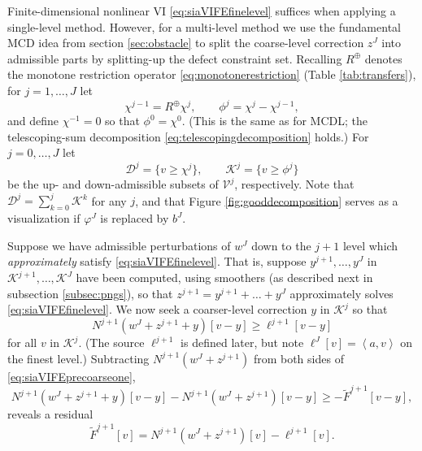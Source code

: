 \documentclass[letterpaper,final,12pt,reqno]{amsart}
\theoremstyle{claim}
\newcommand{\ip}[2]{\left<#1,#2\right>}
\newcommand{\mR}{R^{\bm{\oplus}}}
\numberwithin{equation}{section}
\numberwithin{figure}{section}
\numberwithin{table}{section}
\numberwithin{theorem}{section}
\begin{document}
Finite-dimensional nonlinear VI \eqref{eq:siaVIFEfinelevel} suffices when applying a single-level method.  However, for a multi-level method we use the fundamental MCD idea from section \ref{sec:obstacle} to split the coarse-level correction $z^J$ into admissible parts by splitting-up the defect constraint set.  Recalling $\mR$ denotes the monotone restriction operator \eqref{eq:monotonerestriction} (Table \ref{tab:transfers}), for $j=1,\dots,J$ let
    $$\chi^{j-1} = \mR \chi^j, \qquad \phi^j = \chi^j - \chi^{j-1},$$
and define $\chi^{-1}=0$ so that $\phi^0=\chi^0$.  (This is the same as for MCDL; the telescoping-sum decomposition \eqref{eq:telescopingdecomposition} holds.)  For $j=0,\dots,J$ let
    $$\mathcal{D}^j = \{v \ge \chi^j\}, \qquad \mathcal{K}^j = \{v \ge \phi^j\}$$
be the up- and down-admissible subsets of $\mathcal{V}^j$, respectively.  Note that $\mathcal{D}^j = \sum_{k=0}^j \mathcal{K}^k$ for any $j$, and that Figure \ref{fig:gooddecomposition} serves as a visualization if $\varphi^J$ is replaced by $b^J$.

Suppose we have admissible perturbations of $w^J$ down to the $j+1$ level which \emph{approximately} satisfy \eqref{eq:siaVIFEfinelevel}.  That is, suppose $y^{j+1},\dots,y^J$ in $\mathcal{K}^{j+1},\dots,\mathcal{K}^J$ have been computed, using smoothers (as described next in subsection \ref{subsec:pngs}), so that $z^{j+1}=y^{j+1}+\dots+y^J$ approximately solves \eqref{eq:siaVIFEfinelevel}.  We now seek a coarser-level correction $y$ in $\mathcal{K}^j$ so that
\begin{equation}
N^{j+1}(w^J+z^{j+1}+y)[v-y] \ge \ell^{j+1}[v-y] \label{eq:siaVIFEprecoarseone}
\end{equation}
for all $v$ in $\mathcal{K}^j$.  (The source $\ell^{j+1}$ is defined later, but note $\ell^J[v] = \ip{a}{v}$ on the finest level.)  Subtracting $N^{j+1}(w^J+z^{j+1})$ from both sides of \eqref{eq:siaVIFEprecoarseone},
\begin{equation}
N^{j+1}(w^J+z^{j+1}+y)[v-y] - N^{j+1}(w^J+z^{j+1})[v-y] \ge - \tilde F^{j+1}[v-y], \label{eq:siaVIFEprecoarsetwo}
\end{equation}
reveals a residual
\begin{equation}
\tilde F^{j+1}[v] = N^{j+1}(w^J+z^{j+1})[v] - \ell^{j+1}[v].
\end{equation}
\end{document}
